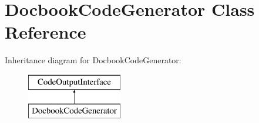 \hypertarget{class_docbook_code_generator}{}\section{Docbook\+Code\+Generator Class Reference}
\label{class_docbook_code_generator}
Inheritance diagram for Docbook\+Code\+Generator\+:\begin{figure}[H]
\begin{center}
\leavevmode
\includegraphics[height=2.000000cm]{class_docbook_code_generator}
\end{center}
\end{figure}
